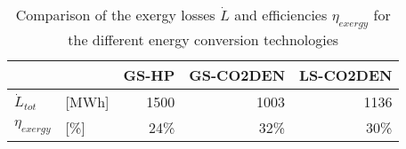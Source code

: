 \begin{table}[htp]
\centering
\caption{Comparison of the exergy losses $\dot{L}$ and efficiencies $\eta_{exergy}$ for the different energy conversion technologies}\vspace{2mm}
\label{tab:V_exergy} 
\begin{tabular}{llrrr} \toprule
	                    &  & GS-HP & GS-CO2DEN & LS-CO2DEN \\ \midrule
	$\dot{L}_{tot}$            & [MWh] & 1500   & 1003       & 1136       \\
	$\eta_{exergy}$      & [\%]  & 24\%   & 32\%       & 30\%       \\
 \bottomrule
	\end{tabular}
\end{table}
